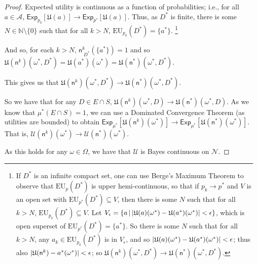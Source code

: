 \documentclass[a4paper,final]{article}
\newcommand\A{\mathcal{A}}
\newcommand\Exp{\mathsf{Exp}}
\newcommand\EU{\mathrm{EU}}
\newcommand\U{\mathfrak{U}} %
\newcommand\Uwald{\mathcal{U}} %
\newcommand{\n}{\mathsf{n}}
\renewcommand{\nu}{\n}
\newcommand\Nu{\mathcal{N}}
\newcommand\SetDelimiter[1][]{
	\nonscript\,#1\vert \allowbreak \nonscript\,\mathopen{}}
\providecommand\given{\SetDelimiter}
\DeclarePairedDelimiter\abs{\lvert}{\rvert}%
\newenvironment{CCM rewritten}
{\begingroup\color{blue}} %
{\endgroup}              %
\begin{document}
\begin{proof}
Expected utility is continuous as a function of probabilities; i.e., for all $a\in\A$, $\Exp_{p_k}[\U(a)]\longrightarrow \Exp_{p^*}[\U(a)]$. Thus, as $D^*$ is finite, there is some $N\in\mathbb{N}\setminus\{0\}$ such that for all $k>N$, $\EU_{p_k}(D^*)=\{a^*\}$.%
\footnote{If $D^*$ is an infinite  compact set, one can use Berge's Maximum Theorem to observe that $\EU_p(D^*)$ is upper hemi-continuous, so that if $p_k\longrightarrow p^*$ and $V$ is an open set with $\EU_{p^*}(D^*)\subseteq V$, then there is some $N$ such that for all $k>N$, $\EU_{p_k}(D^*)\subseteq V$. Let $V_{\epsilon}=\{a\given \abs{\U(a)(\omega^*)-\U(a^*)(\omega^*)}<\epsilon\}$, which is open superset of $\EU_{p^*}(D^*)=\{a^*\}$. So there is some $N$ such that for all $k>N$, any $a_k\in\EU_{p_k}(D^*)$ is in $V_{\epsilon}$, and so $\abs{\U(a)(\omega^*)-\U(a^*)(\omega^*)}<\epsilon$; thus also $\abs{\U(\nu^k)- a^*(\omega^*)}<\epsilon$; so $\U(\nu^k)(\omega^*,D^*)\longrightarrow\U(\nu^*)(\omega^*,D^*)$. } 

And so, for each $k>N$, $\nu^k_{\;D^*}(\{a^*\})=1$ and  so $\U(\nu^k)(\omega^*,D^*)=\U(a^*)(\omega^*)=\U(\nu^*)(\omega^*,D^*)$. 

This gives us that $\U(\nu^k)(\omega^*,D^*)\longrightarrow\U(\nu^*)(\omega^*,D^*)$. 

So we have that for any  $D\in E\cap S$, $\U(\nu^k)(\omega^*,D)\longrightarrow\U(\nu^*)(\omega^*,D)$.
As we know that  $\mu^*(E\cap S)=1$, we can use a Dominated Convergence Theorem (as utilities are bounded) to obtain
$\Exp_{\mu^*}[\U(\nu^k)(\omega^*)]\longrightarrow\Exp_{\mu^*}[\U(\nu^*)(\omega^*)]$. That is, $\Uwald(\nu^k)(\omega^*)\longrightarrow\Uwald(\nu^*)(\omega^*)$. 

As this holds for any $\omega\in\Omega$, we have that $\Uwald$ is Bayes continuous on $\Nu$. 
\end{proof}
\end{document}
